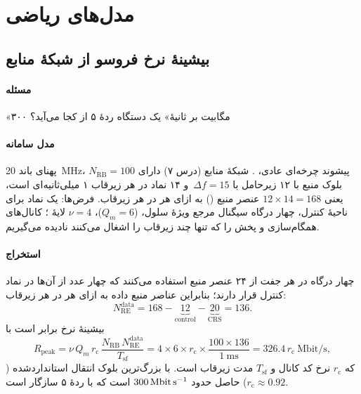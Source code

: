 \documentclass[11pt,a4paper]{article}
\begin{document}
\section{مدل‌های ریاضی}

\subsection{بیشینهٔ نرخ فروسو از شبکهٔ منابع}\label{sec:peak}
\paragraph{مسئله} «۳۰۰ مگابیت بر ثانیهٔ» یک دستگاه  ردهٔ ۵ از کجا می‌آید؟
\paragraph{مدل سامانه} پهنای باند \qty{20}{\mega\hertz}، پیشوند چرخه‌ای عادی، . شبکهٔ منابع
(درس ۷) دارای $N_{\mathrm{RB}} = 100$ بلوک منبع با ۱۲ زیرحامل با $\Delta f = 15$\, و ۱۴ نماد
 در هر زیرقاب ۱ میلی‌ثانیه‌ای است، یعنی $12\times14 = 168$ عنصر منبع () به ازای هر
 در هر زیرقاب. فرض‌ها: یک نماد  برای ناحیهٔ کنترل، چهار درگاه سیگنال مرجع ویژهٔ
سلول،  ($Q_m = 6$)، $\nu = 4$ لایهٔ ؛ کانال‌های همگام‌سازی و پخش را که تنها چند
زیرقاب را اشغال می‌کنند نادیده می‌گیریم.
\paragraph{استخراج} چهار درگاه  در هر جفت  از ۲۴ عنصر منبع استفاده می‌کنند که چهار عدد
از آن‌ها در نماد کنترل قرار دارند؛ بنابراین عناصر منبع داده به ازای هر  در هر زیرقاب:
\begin{equation}
  N_{\mathrm{RE}}^{\mathrm{data}} = 168 - \underbrace{12}_{\text{control}} - \underbrace{20}_{\text{CRS}} = 136 .
\end{equation}
بیشینهٔ نرخ برابر است با
\begin{equation}\label{eq:peak}
  R_{\mathrm{peak}} = \nu\, Q_m\, r_\mathrm{c}\,\frac{N_{\mathrm{RB}}\,N_{\mathrm{RE}}^{\mathrm{data}}}{T_{\mathrm{sf}}}
  = 4\times6\times r_\mathrm{c}\times\frac{100\times136}{\qty{1}{\milli\second}}
  = 326.4\,r_\mathrm{c}\ \mathrm{Mbit/s},
\end{equation}
که $r_\mathrm{c}$ نرخ کد کانال و $T_{\mathrm{sf}}$ مدت زیرقاب است. با بزرگ‌ترین بلوک انتقال استانداردشده
($r_\mathrm{c}\approx0.92$) حاصل حدود $\qty{300}{\mega\bit\per\second}$ است که با
 ردهٔ ۵  سازگار است.
\end{document}
